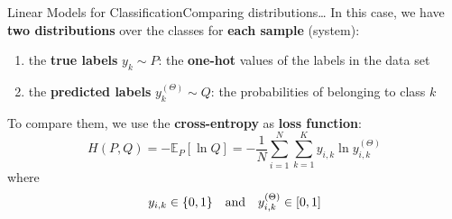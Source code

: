 \begin{frame}{Linear Models for Classification}{Comparing distributions\dots}
    In this case, we have \textbf{two distributions} over the classes for \textbf{each sample} (system):
    \begin{enumerate}
        \item the \textbf{true labels} $y_k \sim P$: the \textbf{one-hot} values of the labels in the data set
        \item the \textbf{predicted labels} $y_k^{(\Theta)} \sim Q$: the probabilities of belonging to class $k$
    \end{enumerate}

    \vfill

    To compare them, we use the \textbf{cross-entropy} as \textbf{loss function}:
    \begin{equation*}
        H(P, Q) = - \mathbb{E}_P[\ln Q]
        =
        - \frac{1}{N} \sum\limits_{i = 1}^N \sum\limits_{k = 1}^K y_{i,k} \ln y_{i,k}^{(\Theta)}
    \end{equation*}
    where
    \begin{equation*}
        y_{i,k} \in \{0, 1\}
        \qand
        y_{i,k}^{(\Theta)} \in [0, 1]
    \end{equation*}
\end{frame}

